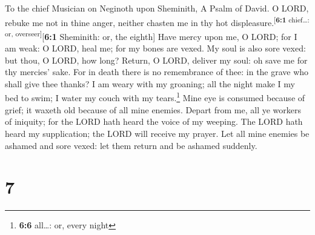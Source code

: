 To the chief Musician on Neginoth upon Sheminith, A Psalm of David.
 O LORD, rebuke me not in thine anger, neither chasten me
in thy hot displeasure.\textsuperscript{{[}\textbf{6:1} chief\ldots: or,
overseer{]}}{[}\textbf{6:1} Sheminith: or, the eighth{]} 
Have mercy upon me, O LORD; for I am weak: O LORD, heal me; for my bones
are vexed.  My soul is also sore vexed: but thou, O LORD,
how long?  Return, O LORD, deliver my soul: oh save me for
thy mercies' sake.  For in death there is no remembrance
of thee: in the grave who shall give thee thanks?  I am
weary with my groaning; all the night make I my bed to swim; I water my
couch with my tears.\footnote{\textbf{6:6} all\ldots: or, every night}
 Mine eye is consumed because of grief; it waxeth old
because of all mine enemies.  Depart from me, all ye
workers of iniquity; for the LORD hath heard the voice of my weeping.
 The LORD hath heard my supplication; the LORD will
receive my prayer.  Let all mine enemies be ashamed and
sore vexed: let them return and be ashamed suddenly.

\hypertarget{section-6}{%
\section{7}\label{section-6}}

